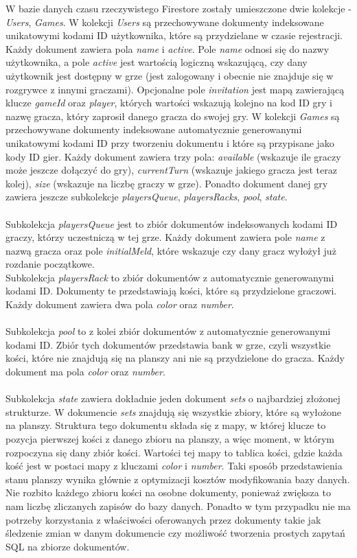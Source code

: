 W bazie danych czasu rzeczywistego Firestore zostały umieszczone dwie kolekcje - \emph{Users}, \emph{Games}. W kolekcji \emph{Users} są przechowywane dokumenty indeksowane unikatowymi kodami ID użytkownika, które są przydzielane w czasie rejestracji. Każdy dokument zawiera pola \emph{name} i \emph{active}. Pole \emph{name} odnosi się do nazwy użytkownika, a pole \emph{active} jest wartością logiczną wskazującą, czy dany użytkownik jest dostępny w grze (jest zalogowany i obecnie nie znajduje się w rozgrywce z innymi graczami). Opcjonalne pole \emph{invitation} jest mapą zawierającą klucze \emph{gameId} oraz \emph{player}, których wartości wskazują kolejno na kod ID gry i nazwę gracza, który zaprosił danego gracza do swojej gry. W kolekcji \emph{Games} są przechowywane dokumenty indeksowane automatycznie generowanymi unikatowymi kodami ID przy tworzeniu dokumentu i które są przypisane jako kody ID gier. Każdy dokument zawiera trzy pola: \emph{available} (wskazuje ile graczy może jeszcze dołączyć do gry), \emph{currentTurn} (wskazuje jakiego gracza jest teraz kolej), \emph{size} (wskazuje na liczbę graczy w grze). Ponadto dokument danej gry zawiera jeszcze subkolekcje \emph{playersQueue}, \emph{playersRacks}, \emph{pool}, \emph{state}. \\ \\
Subkolekcja \emph{playersQueue} jest to zbiór dokumentów indeksowanych kodami ID graczy, którzy uczestniczą w tej grze. Każdy dokument zawiera pole \emph{name} z nazwą gracza oraz pole \emph{initialMeld}, które wskazuje czy dany gracz wyłożył już rozdanie początkowe. \\
Subkolekcja \emph{playersRack} to zbiór dokumentów z automatycznie generowanymi kodami ID. Dokumenty te przedstawiają kości, które są przydzielone graczowi. Każdy dokument zawiera dwa pola \emph{color} oraz \emph{number}. \\ \\
Subkolekcja \emph{pool} to z kolei zbiór dokumentów z automatycznie generowanymi kodami ID. Zbiór tych dokumentów przedstawia bank w grze, czyli wszystkie kości, które nie znajdują się na planszy ani nie są przydzielone do gracza. Każdy dokument ma pola \emph{color} oraz \emph{number}. \\ \\
Subkolekcja \emph{state} zawiera dokładnie jeden dokument \emph{sets} o najbardziej złożonej strukturze. W dokumencie \emph{sets} znajdują się wszystkie zbiory, które są wyłożone na planszy. Struktura tego dokumentu składa się z mapy, w której klucze to pozycja pierwszej kości z danego zbioru na planszy, a więc moment, w którym rozpoczyna się dany zbiór kości. Wartości tej mapy to tablica kości, gdzie każda kość jest w postaci mapy z kluczami \emph{color} i \emph{number}. Taki sposób przedstawienia stanu planszy wynika głównie z optymizacji kosztów modyfikowania bazy danych. Nie rozbito każdego zbioru kości na osobne dokumenty, ponieważ zwiększa to nam liczbę zliczanych zapisów do bazy danych. Ponadto w tym przypadku nie ma potrzeby korzystania z właściwości oferowanych przez dokumenty takie jak śledzenie zmian w danym dokumencie czy możliwość tworzenia prostych zapytań SQL na zbiorze dokumentów.

